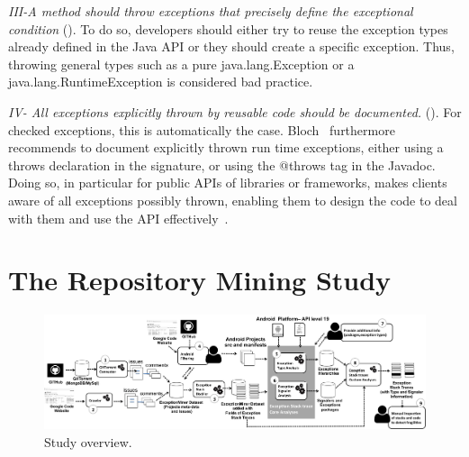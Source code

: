 \emph{III-A method should throw exceptions that precisely define the
exceptional condition} (\cite{gosling2000java,bloch2008effective}). To do so,
developers should either try to reuse the exception types already defined in the
Java API or they should create a specific exception. Thus, throwing general types such as a
pure java.lang.Exception or a java.lang.RuntimeException is considered bad practice.


\emph{IV- All exceptions explicitly thrown by reusable code should be documented.}
(\cite{mandrioli1992advances,gosling2000java,wirfs2006toward,bloch2008effective}).
For checked exceptions, this is automatically the case.
Bloch~\cite{bloch2008effective} furthermore recommends to document explicitly thrown
run time exceptions, either using a throws declaration in the signature, or using
the @throws tag in the Javadoc.
Doing so, in particular for public APIs of libraries or frameworks,
makes clients aware of all exceptions possibly thrown,
enabling them to design the code to deal with them and use the API effectively~\cite{Robil00,wirfs2006toward}.


\section{The Repository Mining Study}
\label{sec:study}

\begin{figure} 
\centering \includegraphics[width=.9\hsize]{overview_review.png}
\caption{Study overview.}\label{fig:overview} 
\end{figure}


